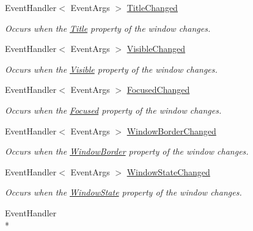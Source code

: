 \begin{DoxyCompactItemize}
Event\-Handler$<$ Event\-Args $>$ \hyperlink{interface_open_t_k_1_1_i_native_window_acf92dea76cdae1958f4d899f6ebf2ff4}{Title\-Changed}
\begin{DoxyCompactList}\small\item\em Occurs when the \hyperlink{interface_open_t_k_1_1_i_native_window_acc6e79eb06f9e7d725f6eac5ac1df71d}{Title} property of the window changes. \end{DoxyCompactList}\item 
Event\-Handler$<$ Event\-Args $>$ \hyperlink{interface_open_t_k_1_1_i_native_window_a848de842c644e1c4066e87e16dca3555}{Visible\-Changed}
\begin{DoxyCompactList}\small\item\em Occurs when the \hyperlink{interface_open_t_k_1_1_i_native_window_ac455c50c69983d4a26e7ed61336290d8}{Visible} property of the window changes. \end{DoxyCompactList}\item 
Event\-Handler$<$ Event\-Args $>$ \hyperlink{interface_open_t_k_1_1_i_native_window_ae0a2b1803d348c1a23cddcf384ee4008}{Focused\-Changed}
\begin{DoxyCompactList}\small\item\em Occurs when the \hyperlink{interface_open_t_k_1_1_i_native_window_aaa2ef631c8bd4bcbef3374dfaeb50299}{Focused} property of the window changes. \end{DoxyCompactList}\item 
Event\-Handler$<$ Event\-Args $>$ \hyperlink{interface_open_t_k_1_1_i_native_window_a31bb2ed82c8646aee97bda920ef92aae}{Window\-Border\-Changed}
\begin{DoxyCompactList}\small\item\em Occurs when the \hyperlink{interface_open_t_k_1_1_i_native_window_afb974cc1ffb686860725736bd07c2211}{Window\-Border} property of the window changes. \end{DoxyCompactList}\item 
Event\-Handler$<$ Event\-Args $>$ \hyperlink{interface_open_t_k_1_1_i_native_window_ae13b78b7d872ee1a62950a8b6b5983b8}{Window\-State\-Changed}
\begin{DoxyCompactList}\small\item\em Occurs when the \hyperlink{interface_open_t_k_1_1_i_native_window_a228db8bdb7282c03e98c103bc6ea9904}{Window\-State} property of the window changes. \end{DoxyCompactList}\item 
Event\-Handler\\*

\end{DoxyCompactItemize}
